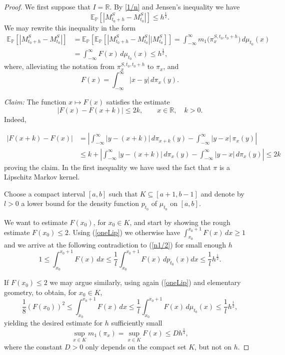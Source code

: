 \documentclass[11pt,a4paper]{article}%
\def\E{{\mathbb E}}
\def\P{{\mathbb P}}
\def\R{{\mathbb R}}
\numberwithin{equation}{section}
\begin{document}
\begin{proof}
We first suppose that $I=\R$. By \eqref{1/n} and Jensen's inequality we have
\[
	\E_\P[|M^S_{t_0+h} - M^S_{t_0}|] \le  h^{\frac{1}{2}}.
\]
 We may rewrite this inequality in the form 
\begin{align} \nonumber
\E_\P[|M^S_{t_0+h} - M^S_{t_0}|] &= \E_\P[\E_\P[|M^S_{t_0+h} - M^S_{t_0}|  \big | M^S_{t_0}]] = \int_{-\infty}^\infty m_1\biggl(\pi_x^{S ,t_0 ,t_0 +h}\biggr) \, d\mu_{t_0}(x) 
\\ \label{n1/2}	 &=    \int_{-\infty}^\infty F(x) \, d\mu_{t_0}(x)\le  h^{\frac{1}{2}},
\end{align}
where, alleviating the notation from $\pi_x^{S ,t_0 ,t_0 +h}$ to $\pi_x$, and
\[ F(x)=\int_{-\infty}^\infty |x - y| \, d\pi_x(y). \]

\textit{Claim:} The function $x \mapsto F(x)$ satisfies the estimate
\begin{equation}\label{oneLip}
	|F(x) - F(x+k)| \le 2k,  \qquad x \in \R,\quad k>0.
\end{equation}
Indeed,

\begin{align*}
	|F(x+k) - F(x)| &= \left| \int_{-\infty}^{\infty} |y - (x + k)| \, d\pi_{x+k}(y) - \int_{-\infty}^{\infty} |y-x| \, \pi_x(y) \right|
	\\ &\leq  k + \left| \int_{-\infty}^\infty |y - (x+k)| \, d\pi_{x}(y) - \int_{-\infty}^\infty |y-x| \, d\pi_x(y) \right| \leq 2k
\end{align*}
proving the claim. 
In the first inequality we have used the fact that $\pi$ is a Lipschitz Markov kernel.

Choose a compact interval $[a,b]$ such that $K \subseteq [a+1,b-1]$ and denote by $l>0$ a lower bound for the density function $p_{t_0}$ of $\mu_{t_0}$ on $[a,b]$.

We want to estimate $F(x_0)$, for $x_0 \in K$, and start by showing the rough estimate $F(x_0) \le  2$.
Using (\ref{oneLip}) we otherwise have $\int_{x_0}^{x_0+1} F(x) \, dx \ge 1$ and we arrive at the following contradiction to (\ref{n1/2}) for small enough $h$
\[ 1 \le \int_{x_0}^{x_0+1} F(x) \, dx  \le \frac{1}{l} \int_{x_0}^{x_0+1}F(x) \, dp_{t_0}(x) dx \le \frac{1}{l} h^{\frac{1}{2}}. \]



If $F(x_0) \le 2$ we may argue similarly, using again
(\ref{oneLip}) and elementary geometry, to obtain, for $x_0 \in K$,
\[ \frac{1}{8} (F(x_0))^2 \le \int_{x_0}^{x_0+1} F(x) \, dx \le \frac{1}{l} \int_{x_0}^{x_0+1}F(x) \, d\mu_{t_0}(x) \le \frac{1}{l} h^{\frac{1}{2}},\]
yielding the desired estimate for $h$ sufficiently small
\[ \sup_{x\in K}   m_1(\pi_x) =   \sup_{x\in K}  F(x) \le D h^{\frac{1}{4}}, \]
where the constant $D>0$ only depends on the compact set $K$, but not on $h$.


\end{proof}
\end{document}
